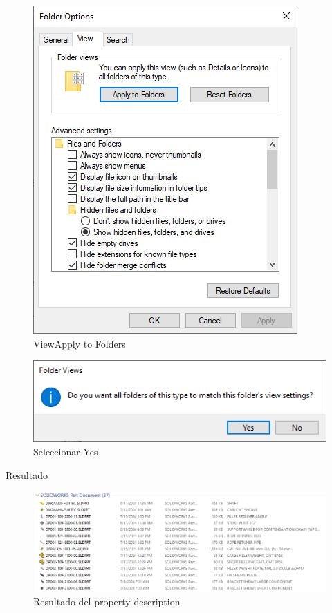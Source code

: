 \documentclass[12pt,letterpaper,final]{report}
\begin{document}
\begin{figure}[H]
	\centering
	\includegraphics[width=0.85\linewidth, height=0.5\textheight,keepaspectratio]{Imagenes/fe_prop_desc_04}
	\caption{View\textrightarrow Apply to Folders}
	\label{fig:fepropdesc04}
\end{figure}

\begin{figure}[H]
	\centering
	\includegraphics[width=0.85\linewidth, height=0.5\textheight,keepaspectratio]{Imagenes/fe_prop_desc_05}
	\caption{Seleccionar Yes}
	\label{fig:fepropdesc05}
\end{figure}

\clearpage

{\LARGE Resultado}

\begin{figure}[H]
	\centering
	\includegraphics[width=0.95\linewidth, height=0.5\textheight,keepaspectratio]{Imagenes/fe_prop_desc_06}
	\caption{Resultado del property description}
	\label{fig:fepropdesc06}
\end{figure}
\end{document}

